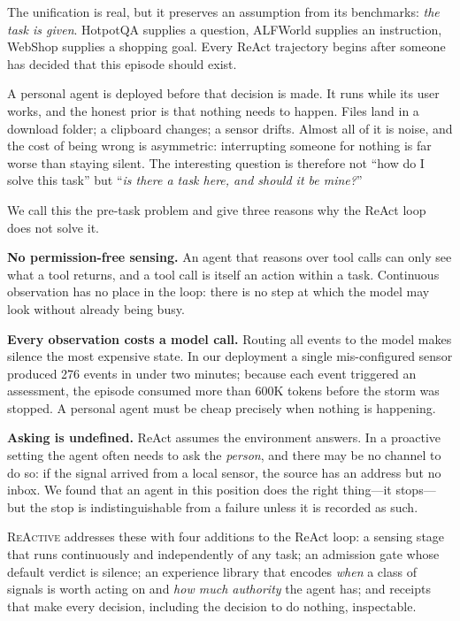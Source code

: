\documentclass[10pt,a4paper]{article}
\newcommand{\sys}{\textsc{ReActive}}
\begin{document}
The unification is real, but it preserves an assumption from its benchmarks:
\emph{the task is given}. HotpotQA supplies a question, ALFWorld supplies an
instruction, WebShop supplies a shopping goal. Every ReAct trajectory begins
after someone has decided that this episode should exist.

A personal agent is deployed before that decision is made. It runs while its
user works, and the honest prior is that nothing needs to happen. Files land
in a download folder; a clipboard changes; a sensor drifts. Almost all of it
is noise, and the cost of being wrong is asymmetric: interrupting someone for
nothing is far worse than staying silent. The interesting question is
therefore not ``how do I solve this task'' but ``\emph{is there a task here,
and should it be mine?}''

We call this the pre-task problem and give three reasons why the ReAct loop
does not solve it.

\textbf{No permission-free sensing.} An agent that reasons over tool calls
can only see what a tool returns, and a tool call is itself an action within
a task. Continuous observation has no place in the loop: there is no step at
which the model may look without already being busy.

\textbf{Every observation costs a model call.} Routing all events to the
model makes silence the most expensive state. In our deployment a single
mis-configured sensor produced 276 events in under two minutes; because each
event triggered an assessment, the episode consumed more than 600K tokens
before the storm was stopped. A personal agent must be cheap precisely when
nothing is happening.

\textbf{Asking is undefined.} ReAct assumes the environment answers. In a
proactive setting the agent often needs to ask the \emph{person}, and there
may be no channel to do so: if the signal arrived from a local sensor, the
source has an address but no inbox. We found that an agent in this position
does the right thing---it stops---but the stop is indistinguishable from a
failure unless it is recorded as such.

\sys{} addresses these with four additions to the ReAct loop: a sensing
stage that runs continuously and independently of any task; an admission
gate whose default verdict is silence; an experience library that encodes
\emph{when} a class of signals is worth acting on and \emph{how much
authority} the agent has; and receipts that make every decision, including
the decision to do nothing, inspectable.
\end{document}
